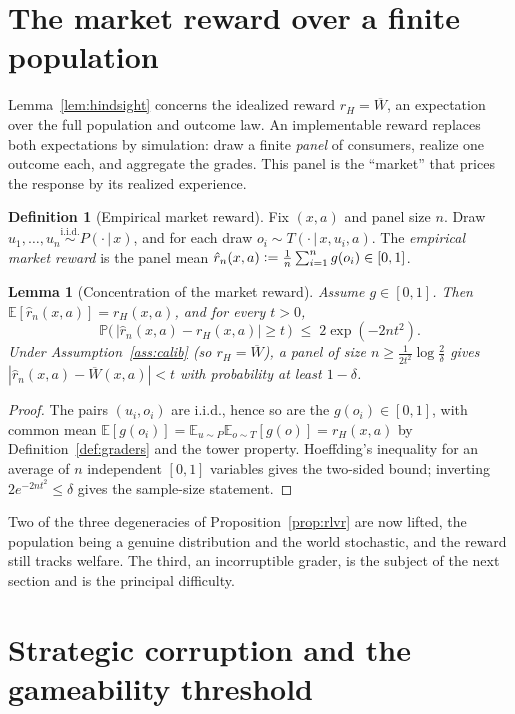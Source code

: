 \documentclass[11pt]{article}
\theoremstyle{plain}
\newtheorem{lemma}{Lemma}
\theoremstyle{definition}
\newtheorem{definition}{Definition}
\theoremstyle{remark}
\newcommand{\E}{\mathbb{E}}
\newcommand{\Prob}{\mathbb{P}}
\newcommand{\Wbar}{\overline{W}}
\newcommand{\given}{\,\vert\,}
\newcommand{\defeq}{\vcentcolon=}
\begin{document}
\section{The market reward over a finite population}
\label{sec:market}

Lemma~\ref{lem:hindsight} concerns the idealized reward $r_H=\Wbar$, an expectation over the
full population and outcome law. An implementable reward replaces both expectations by
simulation: draw a finite \emph{panel} of consumers, realize one outcome each, and aggregate the
grades. This panel is the ``market'' that prices the response by its realized experience.

\begin{definition}[Empirical market reward]
\label{def:market}
Fix $(x,a)$ and panel size $n$. Draw $u_1,\dots,u_n\stackrel{\text{i.i.d.}}{\sim}
P(\cdot\given x)$, and for each draw $o_i\sim T(\cdot\given x,u_i,a)$. The \emph{empirical
market reward} is the panel mean $\hat r_n(x,a)\defeq\frac1n\sum_{i=1}^n g(o_i)\in[0,1]$.
\end{definition}

\begin{lemma}[Concentration of the market reward]
\label{lem:concentration}
Assume $g\in[0,1]$. Then $\E[\hat r_n(x,a)]=r_H(x,a)$, and for every $t>0$,
\[
  \Prob\big(\,|\hat r_n(x,a)-r_H(x,a)|\ge t\,\big)\;\le\;2\exp(-2nt^2).
\]
Under Assumption~\ref{ass:calib} (so $r_H=\Wbar$), a panel of size
$n\ge\frac{1}{2t^2}\log\frac2\delta$ gives $|\hat r_n(x,a)-\Wbar(x,a)|<t$ with probability at
least $1-\delta$.
\end{lemma}

\begin{proof}
The pairs $(u_i,o_i)$ are i.i.d., hence so are the $g(o_i)\in[0,1]$, with common mean
$\E[g(o_i)]=\E_{u\sim P}\E_{o\sim T}[g(o)]=r_H(x,a)$ by Definition~\ref{def:graders} and the
tower property. Hoeffding's inequality \cite{hoeffding} for an average of $n$ independent
$[0,1]$ variables gives the two-sided bound; inverting $2e^{-2nt^2}\le\delta$ gives the
sample-size statement.
\end{proof}

Two of the three degeneracies of Proposition~\ref{prop:rlvr} are now lifted, the population
being a genuine distribution and the world stochastic, and the reward still tracks welfare. The
third, an incorruptible grader, is the subject of the next section and is the principal
difficulty.


\section{Strategic corruption and the gameability threshold}
\label{sec:game}
\end{document}
